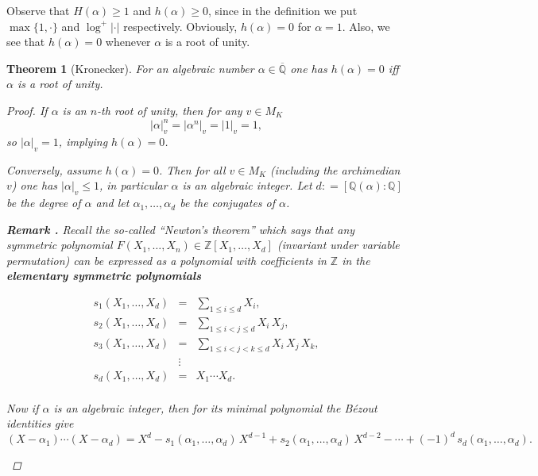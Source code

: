\documentclass{article}
\newtheorem{theorem}[proposition]{Theorem}
\theoremstyle{definition}
\newcommand{\term}{\textbf}
\newcommand{\dfn}{\mathrel{\mathop:}=}
\newcommand{\ZZ}{\mathbb{Z}}
\newcommand{\QQ}{\mathbb{Q}}
\newenvironment{remark}
{ \begin{shaded}\begingroup\small\noindent\refstepcounter{proposition}\textbf{Remark \theproposition.} }
{ \endgroup\end{shaded} }
\begin{document}
Observe that $H (\alpha) \ge 1$ and $h (\alpha) \ge 0$, since in the definition
we put $\max \{1, \cdot\}$ and $\log^+ |\cdot|$ respectively. Obviously,
$h (\alpha) = 0$ for $\alpha = 1$. Also, we see that $h (\alpha) = 0$ whenever
$\alpha$ is a root of unity.

\begin{theorem}[Kronecker]
  \label{theorem:Kronecker-theorem}
  For an algebraic number $\alpha \in \overline{\QQ}$ one has $h (\alpha) = 0$
  iff $\alpha$ is a root of unity.

  \begin{proof}
    If $\alpha$ is an $n$-th root of unity, then for any $v \in M_K$
    \[ |\alpha|_v^n = |\alpha^n|_v = |1|_v = 1, \]
    so $|\alpha|_v = 1$, implying $h (\alpha) = 0$.

    Conversely, assume $h (\alpha) = 0$. Then for all $v\in M_K$ (including the
    archimedian $v$) one has $|\alpha|_v \le 1$, in particular $\alpha$ is an
    algebraic integer. Let $d \dfn [\QQ (\alpha) : \QQ]$ be the degree of
    $\alpha$ and let $\alpha_1, \ldots, \alpha_d$ be the conjugates of $\alpha$.

    \begin{remark}
      Recall the so-called ``Newton's theorem'' which says that any symmetric
      polynomial $F (X_1,\ldots,X_n) \in \ZZ [X_1,\ldots,X_d]$ (invariant under
      variable permutation) can be expressed as a polynomial with coefficients
      in $\ZZ$ in the \term{elementary symmetric polynomials}

      \begin{eqnarray*}
        s_1 (X_1,\ldots,X_d) & = & \sum_{1 \le i \le d} X_i,\\
        s_2 (X_1,\ldots,X_d) & = & \sum_{1 \le i < j \le d} X_i\,X_j,\\
        s_3 (X_1,\ldots,X_d) & = & \sum_{1 \le i < j < k \le d} X_i\,X_j\,X_k,\\
                             & \vdots & \\
        s_d (X_1,\ldots,X_d) & = & X_1\cdots X_d.\\
      \end{eqnarray*}

      Now if $\alpha$ is an algebraic integer, then for its minimal polynomial
      the B\'ezout identities give
      \[ (X-\alpha_1) \cdots (X-\alpha_d) =
        X^d - s_1 (\alpha_1,\ldots,\alpha_d) \, X^{d-1} + s_2 (\alpha_1,\ldots,\alpha_d)\,X^{d-2} - \cdots + (-1)^d \, s_d (\alpha_1,\ldots,\alpha_d). \]


\end{remark}
\end{proof}
\end{theorem}
\end{document}
